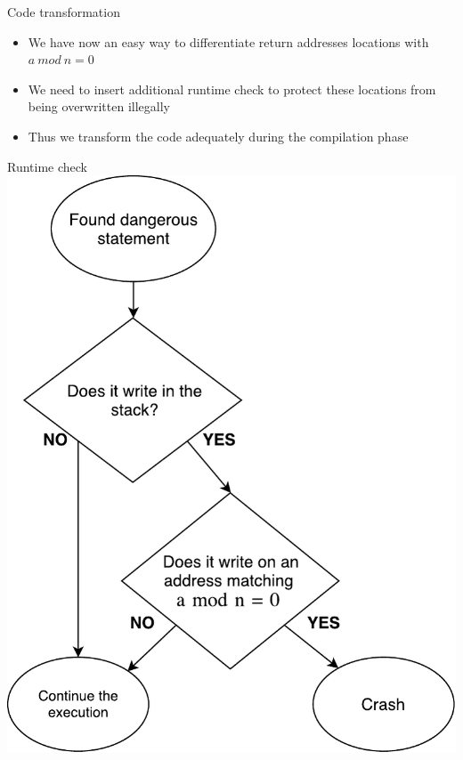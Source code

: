 \documentclass{beamer}
\begin{document}
\begin{frame}[c]{Code transformation}
	\begin{itemize}\itemsep20pt
		\item We have now an easy way to differentiate return addresses locations with $a~mod~n=0$
		\item We need to insert additional runtime check to protect these locations from being overwritten illegally
		\item Thus we transform the code adequately during the compilation phase
	\end{itemize}
\end{frame}

\begin{frame}[c]{Runtime check}
	\vspace{-8mm}
	\hspace{30mm}
   	\includegraphics[height=0.85\textheight]{images/runtime_check.pdf}
\end{frame}
\end{document}

